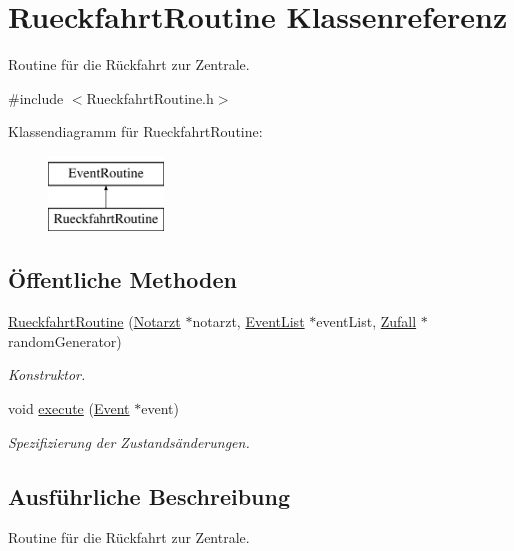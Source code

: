\hypertarget{classRueckfahrtRoutine}{}\section{Rueckfahrt\+Routine Klassenreferenz}
\label{classRueckfahrtRoutine}


Routine für die Rückfahrt zur Zentrale.  




{\ttfamily \#include $<$Rueckfahrt\+Routine.\+h$>$}

Klassendiagramm für Rueckfahrt\+Routine\+:\begin{figure}[H]
\begin{center}
\leavevmode
\includegraphics[height=2.000000cm]{classRueckfahrtRoutine}
\end{center}
\end{figure}
\subsection*{Öffentliche Methoden}
\begin{DoxyCompactItemize}
\item 
\hyperlink{classRueckfahrtRoutine_af906605c22d0d8fd2d002f4fa165afee}{Rueckfahrt\+Routine} (\hyperlink{classNotarzt}{Notarzt} $\ast$notarzt, \hyperlink{classEventList}{Event\+List} $\ast$event\+List, \hyperlink{classZufall}{Zufall} $\ast$random\+Generator)
\begin{DoxyCompactList}\small\item\em Konstruktor. \end{DoxyCompactList}\item 
void \hyperlink{classRueckfahrtRoutine_a7eec059994f3c958696697df05cfefe9}{execute} (\hyperlink{classEvent}{Event} $\ast$event)
\begin{DoxyCompactList}\small\item\em Spezifizierung der Zustandsänderungen. \end{DoxyCompactList}\end{DoxyCompactItemize}


\subsection{Ausführliche Beschreibung}
Routine für die Rückfahrt zur Zentrale. 

